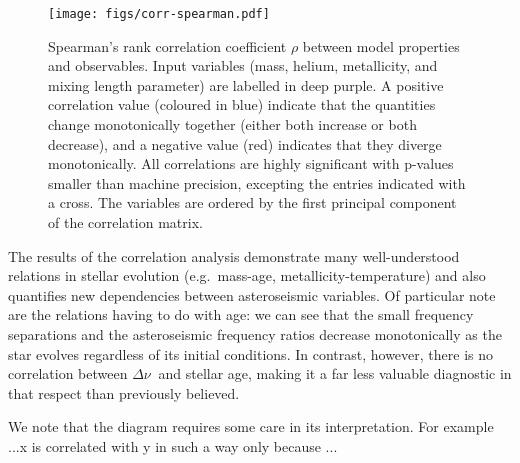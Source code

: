 \documentclass[a4paper,fleqn,usenatbib,useAMS]{mnras}
\newcommand{\Dnu}{\ensuremath{\Delta\nu \ }}
\begin{document}
\begin{figure*}
\centering
\texttt{[image: figs/corr-spearman.pdf]}
\caption{Spearman's rank correlation coefficient $\rho$ between model properties and observables. Input variables (mass, helium, metallicity, and mixing length parameter) are labelled in deep purple. A positive correlation value (coloured in blue) indicate that the quantities change monotonically together (either both increase or both decrease), and a negative value (red) indicates that they diverge monotonically. All correlations are highly significant with p-values smaller than machine precision, excepting the entries indicated with a cross. The variables are ordered by the first principal component of the correlation matrix. } 
\label{fig:corr}
\end{figure*}

The results of the correlation analysis demonstrate many well-understood relations in stellar evolution (e.g.~mass-age, metallicity-temperature) and also quantifies new dependencies between asteroseismic variables. Of particular note are the relations having to do with age: we can see that the small frequency separations and the asteroseismic frequency ratios decrease monotonically as the star evolves regardless of its initial conditions. In contrast, however, there is no correlation between $\Dnu$ and stellar age, making it a far less valuable diagnostic in that respect than previously believed. 

We note that the diagram requires some care in its interpretation. For example ...x is correlated with y in such a way only because ... 
\end{document}

